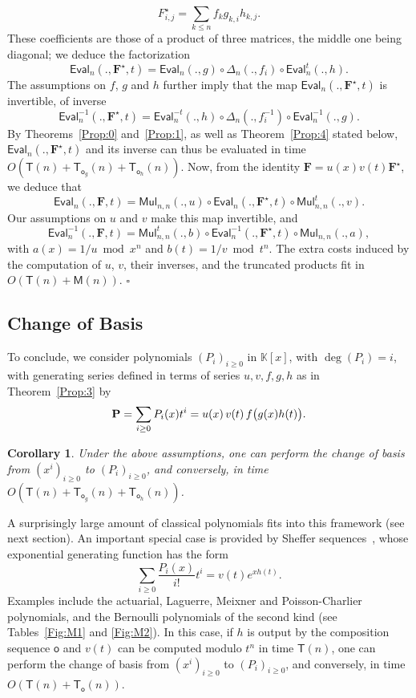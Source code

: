 \documentclass{sig-alternate}
\def\F {\ensuremath{\mathbf{F}}}
\def\K {\ensuremath{\mathbb{K}}}
\def\M{\ensuremath{\mathsf{M}}}
\def\T{\ensuremath{\mathsf{T}}}
\def\o {\ensuremath{\mathsf{o}}}
\def\Diag{\ensuremath{\mathsf{\Delta}}}
\def\mul {\ensuremath{\mathsf{Mul}}}
\def\Eval {\ensuremath{\mathsf{Eval}}}
\def\foorp{\hfill$\square$}
\newtheorem{Coro}{Corollary}
\begin{document}
$$F^\star_{i,j}=\sum_{k \le n} f_k g_{k,i}h_{k,j}.$$ These
coefficients are those of a product of three matrices, the middle one
being diagonal; we deduce the factorization
$$\Eval_n(.,\F^\star,t)=\Eval_n(.,g) \circ \Diag_n(.,f_i) \circ
\Eval^t_n(.,h).$$ The assumptions on $f$, $g$ and $h$ further imply
that the map $\Eval_n(.,\F^\star,t)$ is invertible, of inverse
$$\Eval_n^{-1}(.,\F^\star,t)=\Eval^{-t}_n(.,h) \circ
\Diag_n(.,f_i^{-1}) \circ \Eval_n^{-1}(.,g).$$ By
Theorems~\ref{Prop:0} and~\ref{Prop:1}, as well as
Theorem~\ref{Prop:4} stated below, $\Eval_n(.,\F^\star,t)$ and its
inverse can thus be evaluated in time
$O(\T(n)+\T_{\o_g}(n)+\T_{\o_h}(n))$. Now, from the identity $\F=u(x)
v(t) \F^\star$, we deduce that
$$\Eval_n(.,\F,t) = \mul_{n,n}(., u) \circ \Eval_n(.,\F^\star,t) \circ
\mul_{n,n}^t(., v).$$ Our assumptions on $u$ and $v$ make this
map invertible, and
$$\Eval_n^{-1}(.,\F,t) = \mul_{n,n}^t(.,b) \circ
\Eval_n^{-1}(.,\F^\star,t) \circ \mul_{n,n}(., a),$$ 
with $a(x)=1/u \bmod x^n$ and $b(t)=1/v \bmod t^n$. The extra
costs induced by the computation of $u$, $v$, their inverses, and
the truncated products fit in $O(\T(n)+\M(n))$.
\foorp



\subsection{Change of Basis}

To conclude, we consider polynomials $(P_i)_{i \ge 0}$ in $\K[x]$,
with $\deg(P_i)=i$, with generating series defined in terms of series $u,v,f,g,h$ as in
Theorem~\ref{Prop:3} by
$${\bf P} = \sum_{i \ge 0} P_i(x) t^i =u(x)\, v(t)\,
f\big(g(x)h(t)\big).$$ 
\begin{Coro}
   Under the above assumptions, one can \sloppy perform the change of basis
   from $(x^i)_{i \ge 0}$ to $(P_i)_{i \ge 0}$, and conversely, in
   time $O(\T(n)+\T_{\o_g}(n)+\T_{\o_h}(n))$.
\end{Coro}
A surprisingly large amount of classical polynomials fits into this
framework (see next section). An important special case is provided
by Sheffer sequences~\cite[Chap.~2]{Roman05},
whose exponential generating function has the form
$$\sum_{i \geq 0} \frac{P_i(x)}{i!}  t^i = v(t) e^{x h(t)}.$$ Examples
include the actuarial, Laguerre, Meixner and Pois\-son-Charlier
polynomials, and the Bernoulli polynomials of the second kind (see
Tables~\ref{Fig:M1} and \ref{Fig:M2}). In this case, if $h$ is output
by the composition sequence $\o$ and $v(t)$ can be computed modulo
$t^n$ in time $\T(n)$, one can perform the change of basis from
$(x^i)_{i \ge 0}$ to $(P_i)_{i \ge 0}$, and conversely, in time
$O(\T(n)+\T_{\o}(n))$.
\end{document}

